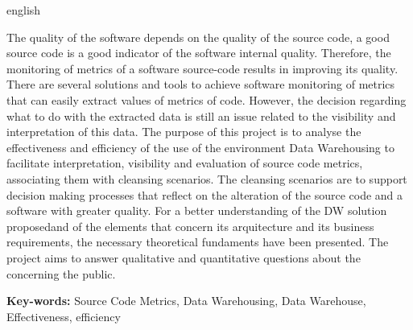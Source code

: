 \begin{resumo}[Abstract]
 \begin{otherlanguage*}{english}
 
The quality of the software depends on the quality of the source code, a good source code is a good indicator of the software internal quality. Therefore, the monitoring of metrics of a software source-code results in improving its quality. There are several solutions and tools to achieve software monitoring of metrics that can easily extract values of metrics of code. However, the decision regarding what to do with the extracted data is still an issue related to the visibility and interpretation of this data. The purpose of this project is to analyse the effectiveness and efficiency of the use of the environment Data Warehousing to facilitate interpretation, visibility and evaluation of source code metrics, associating them with cleansing scenarios. The cleansing scenarios are to support decision making processes that reflect on the alteration of the source code and a software with greater quality. For a better understanding of the DW solution proposedand of the elements that concern its arquitecture and its business requirements, the necessary theoretical fundaments have been presented. The project aims to answer qualitative and quantitative questions about the concerning the public.
 
\textbf{Key-words:} Source Code Metrics,  Data Warehousing, Data Warehouse, Effectiveness, 	 efficiency

 \end{otherlanguage*}
\end{resumo}